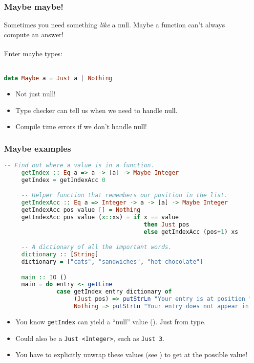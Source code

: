 \documentclass{beamer}
\begin{document}
\begin{frame}[fragile]
  \frametitle{Maybe maybe!}

  Sometimes you need something \emph{like} a null. Maybe a function can't always compute an answer! \\~\\

  \pause
  Enter maybe types: \\~\\

  \begin{lstlisting}[frame=single, language=Haskell, breaklines=true, basicstyle=\ttfamily\tiny]
    data Maybe a = Just a | Nothing
  \end{lstlisting}

  \pause

  \begin{itemize}
  \item Not just null!
  \pause
  \item Type checker can tell us when we need to handle null.
  \pause
  \item Compile time errors if we don't handle null!
  \end{itemize}
\end{frame}

\begin{frame}[fragile]
  \frametitle{Maybe examples}

  \begin{lstlisting}[frame=single, language=Haskell, breaklines=true, basicstyle=\ttfamily\tiny]
     -- Find out where a value is in a function.
     getIndex :: Eq a => a -> [a] -> Maybe Integer
     getIndex = getIndexAcc 0

     -- Helper function that remembers our position in the list.
     getIndexAcc :: Eq a => Integer -> a -> [a] -> Maybe Integer
     getIndexAcc pos value [] = Nothing
     getIndexAcc pos value (x::xs) = if x == value
                                        then Just pos
                                        else getIndexAcc (pos+1) xs

     -- A dictionary of all the important words.
     dictionary :: [String]
     dictionary = ["cats", "sandwiches", "hot chocolate"]

     main :: IO ()
     main = do entry <- getLine
               case getIndex entry dictionary of
                    (Just pos) => putStrLn "Your entry is at position " ++ show pos ++ " in the dictionary."
                    Nothing => putStrLn "Your entry does not appear in the dictionary."
  \end{lstlisting}

  \begin{itemize}
  \pause
  \item You know \texttt{getIndex} can yield a ``null'' value (). Just from type.
  \pause
  \item Could also be a \texttt{Just <Integer>}, such as \texttt{Just 3}.
  \pause
  \item You have to explicitly unwrap these values (see ) to get at the possible value!
  \end{itemize}
\end{frame}
\end{document}
